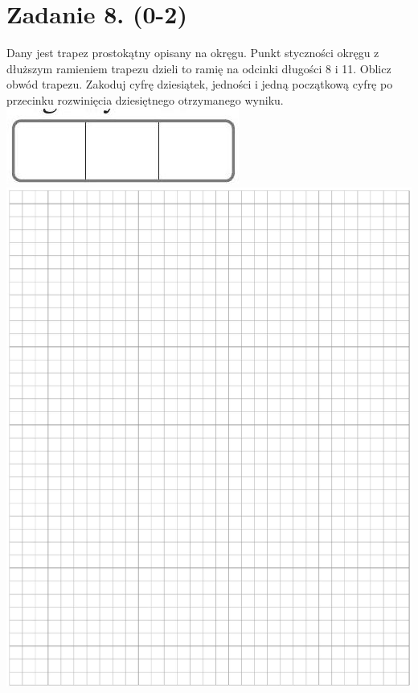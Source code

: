 \documentclass[10pt]{article}
\begin{document}
\section*{Zadanie 8. (0-2)}
Dany jest trapez prostokątny opisany na okręgu. Punkt styczności okręgu z dłuższym ramieniem trapezu dzieli to ramię na odcinki długości 8 i 11. Oblicz obwód trapezu. Zakoduj cyfrę dziesiątek, jedności i jedną początkową cyfrę po przecinku rozwinięcia dziesiętnego otrzymanego wyniku.\\
\includegraphics[max width=\textwidth, center]{2024_11_21_c0ca116654784d42326bg-05}\\
\includegraphics[max width=\textwidth, center]{2024_11_21_c0ca116654784d42326bg-05(1)}
\end{document}
